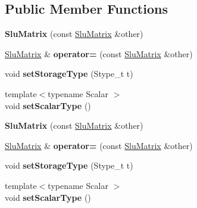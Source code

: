 \subsection*{Public Member Functions}
\begin{DoxyCompactItemize}
\item 
\mbox{\label{struct_eigen_1_1_slu_matrix_a60e084a9e9a1d1dfffb12e70aaf1bc09}} 
{\bfseries Slu\+Matrix} (const \hyperlink{struct_eigen_1_1_slu_matrix}{Slu\+Matrix} \&other)
\item 
\mbox{\label{struct_eigen_1_1_slu_matrix_a1f80eca52f85117e3b3afa29cb4ee332}} 
\hyperlink{struct_eigen_1_1_slu_matrix}{Slu\+Matrix} \& {\bfseries operator=} (const \hyperlink{struct_eigen_1_1_slu_matrix}{Slu\+Matrix} \&other)
\item 
\mbox{\label{struct_eigen_1_1_slu_matrix_ae36a82e01409ad0c3cbbf5847c096f0b}} 
void {\bfseries set\+Storage\+Type} (Stype\+\_\+t t)
\item 
\mbox{\label{struct_eigen_1_1_slu_matrix_a77c5ddf8fd6cfb5314f937976046cf46}} 
{\footnotesize template$<$typename Scalar $>$ }\\void {\bfseries set\+Scalar\+Type} ()
\item 
\mbox{\label{struct_eigen_1_1_slu_matrix_a60e084a9e9a1d1dfffb12e70aaf1bc09}} 
{\bfseries Slu\+Matrix} (const \hyperlink{struct_eigen_1_1_slu_matrix}{Slu\+Matrix} \&other)
\item 
\mbox{\label{struct_eigen_1_1_slu_matrix_a1f80eca52f85117e3b3afa29cb4ee332}} 
\hyperlink{struct_eigen_1_1_slu_matrix}{Slu\+Matrix} \& {\bfseries operator=} (const \hyperlink{struct_eigen_1_1_slu_matrix}{Slu\+Matrix} \&other)
\item 
\mbox{\label{struct_eigen_1_1_slu_matrix_ae36a82e01409ad0c3cbbf5847c096f0b}} 
void {\bfseries set\+Storage\+Type} (Stype\+\_\+t t)
\item 
\mbox{\label{struct_eigen_1_1_slu_matrix_a77c5ddf8fd6cfb5314f937976046cf46}} 
{\footnotesize template$<$typename Scalar $>$ }\\void {\bfseries set\+Scalar\+Type} ()
\end{DoxyCompactItemize}
